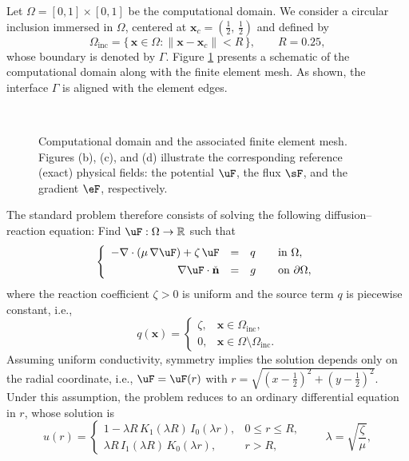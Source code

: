 Let  $\Omega = [0,1]\times[0,1]$ be the computational domain.
We consider a circular inclusion immersed in $\Omega$, centered at $\mathbf{x}_{c} = (\frac12,\,\frac12)$ and defined by
$$
\Omega_{\mathrm{inc}} = \{\, \mathbf{x}\in \Omega : \|\mathbf{x}-\mathbf{x}_{c}\| < R \,\},
\qquad R=0.25,
$$
whose boundary is denoted by $\Gamma$. 
Figure \ref{fig:inclusion_mesh_exact_fields} presents a schematic of the computational domain along with the finite element mesh. As shown, the interface $\Gamma$ is aligned with the element edges. 
\begin{figure}[h!]
	\centering
	\caption{Computational domain and the associated finite element mesh. Figures (b), (c), and (d) illustrate the corresponding reference (exact) physical fields: the potential $\uF$, the flux $\sF$, and the gradient $\eF$, respectively.}
	~\\
	\fontsize{12pt}{10pt}\selectfont 
	\def\svgwidth{0.9\columnwidth}
	
	\label{fig:inclusion_mesh_exact_fields}
\end{figure}
The standard problem therefore consists of solving the following diffusion–reaction equation:
Find $\uF:\Omega \to \mathbb{R}$ such that
\begin{equation}
	\left\lbrace
	\begin{array}{rcll}
		-\nabla \cdot (\mu\,\nabla \uF)+ \zeta\, \uF &=& q
		&\quad \text{in } \Omega, \\[4pt]
		\nabla \uF \cdot \check{\mathbf{n}} &=& g 
		&\quad \text{on } \partial\Omega,
	\end{array}
	\right.
	\label{eq:diff_reaction}
\end{equation}
where the reaction coefficient $\zeta > 0$ is uniform and the source term $q$ 
is piecewise constant, i.e.,
$$
q(\mathbf{x}) =
\begin{cases}
	\zeta, & \mathbf{x}\in \Omega_{\mathrm{inc}}, \\[3pt]
	0, & \mathbf{x}\in \Omega\setminus \Omega_{\mathrm{inc}}.
\end{cases}
$$
Assuming uniform conductivity, symmetry implies the solution depends only on the radial coordinate, i.e., $\uF = \uF(r)$ with $r = \sqrt{(x-\frac12)^{2} + (y-\frac12)^{2}}$. Under this assumption, the problem reduces to an ordinary differential equation in $r$, whose solution is
\begin{equation}
	u(r) =
	\begin{cases}
		\displaystyle
		1 - \lambda R\,K_{1}(\lambda R)\,I_{0}(\lambda r),
		& 0 \le r \le R, \\[10pt]
		\displaystyle
		\lambda R\,I_{1}(\lambda R)\,K_{0}(\lambda r),
		& r > R,
	\end{cases}
	\qquad
	\lambda = \sqrt{\frac{\zeta}{\mu}},
\end{equation}
